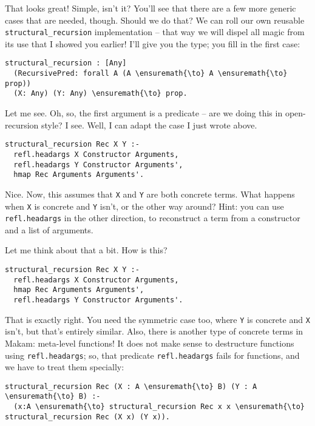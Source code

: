 \heroADVISOR{} That looks great! Simple, isn't it? You'll see that there are a
few more generic cases that are needed, though. Should we do that? We
can roll our own reusable \texttt{structural\_recursion} implementation
-- that way we will dispel all magic from its use that I showed you
earlier! I'll give you the type; you fill in the first case:

\begin{verbatim}
structural_recursion : [Any] 
  (RecursivePred: forall A (A \ensuremath{\to} A \ensuremath{\to} prop))
  (X: Any) (Y: Any) \ensuremath{\to} prop.
\end{verbatim}

\heroSTUDENT{} Let me see. Oh, so, the first argument is a predicate -- are we
doing this in open-recursion style? I see. Well, I can adapt the case I
just wrote above.

\begin{verbatim}
structural_recursion Rec X Y :-
  refl.headargs X Constructor Arguments,
  refl.headargs Y Constructor Arguments',
  hmap Rec Arguments Arguments'.
\end{verbatim}

\heroADVISOR{} Nice. Now, this assumes that \texttt{X} and \texttt{Y} are both
concrete terms. What happens when \texttt{X} is concrete and \texttt{Y}
isn't, or the other way around? Hint: you can use \texttt{refl.headargs}
in the other direction, to reconstruct a term from a constructor and a
list of arguments.

\heroSTUDENT{} Let me think about that a bit. How is this?

\begin{verbatim}
structural_recursion Rec X Y :-
  refl.headargs X Constructor Arguments,
  hmap Rec Arguments Arguments',
  refl.headargs Y Constructor Arguments'.
\end{verbatim}

\heroADVISOR{} That is exactly right. You need the symmetric case too, where
\texttt{Y} is concrete and \texttt{X} isn't, but that's entirely
similar. Also, there is another type of concrete terms in Makam:
meta-level functions! It does not make sense to destructure functions
using \texttt{refl.headargs}; so, that predicate \texttt{refl.headargs}
fails for functions, and we have to treat them specially:

\begin{verbatim}
structural_recursion Rec (X : A \ensuremath{\to} B) (Y : A \ensuremath{\to} B) :-
  (x:A \ensuremath{\to} structural_recursion Rec x x \ensuremath{\to} structural_recursion Rec (X x) (Y x)).
\end{verbatim}

